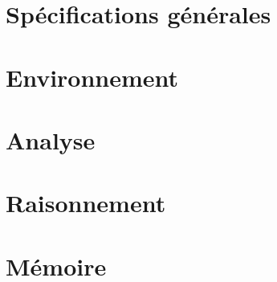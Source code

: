 
\section{Spécifications générales}



\section{Environnement}



\section{Analyse}



\section{Raisonnement}



\section{Mémoire}

